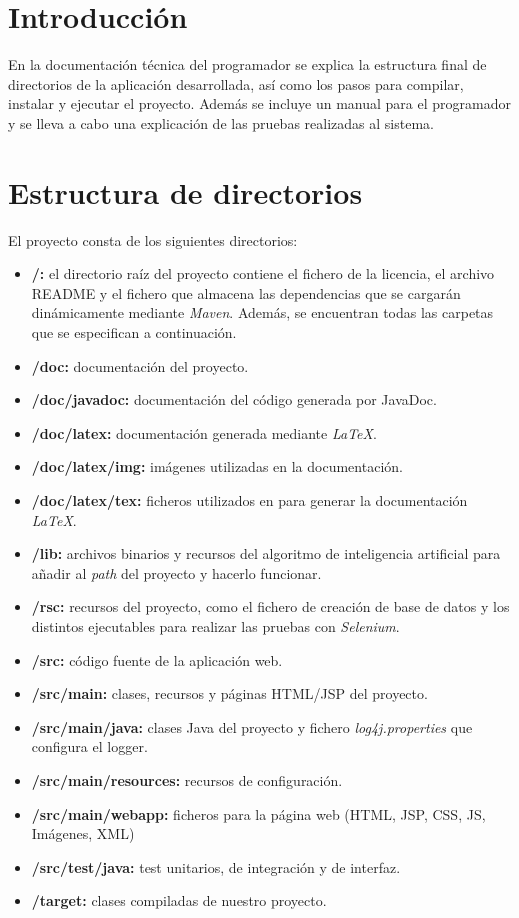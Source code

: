 
\section{Introducción}

En la documentación técnica del programador se explica la estructura final de directorios de la aplicación desarrollada, así como los pasos para compilar, instalar y ejecutar el proyecto. Además se incluye un manual para el programador y se lleva a cabo una explicación de las pruebas realizadas al sistema.

\section{Estructura de directorios}

El proyecto consta de los siguientes directorios:

\begin{itemize}
\tightlist
\item \textbf{/:} el directorio raíz del proyecto contiene el fichero de la licencia, el archivo README y el fichero que almacena las dependencias que se cargarán dinámicamente mediante \emph{Maven}. Además, se encuentran todas las carpetas que se especifican a continuación.
\item \textbf{/doc:} documentación del proyecto.
\item \textbf{/doc/javadoc:} documentación del código generada por JavaDoc.
\item \textbf{/doc/latex:} documentación generada mediante \emph{LaTeX}.
\item \textbf{/doc/latex/img:} imágenes utilizadas en la documentación.
\item \textbf{/doc/latex/tex:} ficheros utilizados en para generar la documentación \emph{LaTeX}.
\item \textbf{/lib:} archivos binarios y recursos del algoritmo de inteligencia artificial para añadir al \emph{path} del proyecto y hacerlo funcionar.
\item \textbf{/rsc:} recursos del proyecto, como el fichero de creación de base de datos y los distintos ejecutables para realizar las pruebas con \emph{Selenium}.
\item \textbf{/src:} código fuente de la aplicación web.
\item \textbf{/src/main:} clases, recursos y páginas HTML/JSP del proyecto.
\item \textbf{/src/main/java:} clases Java del proyecto y fichero \emph{log4j.properties} que configura el logger.
\item \textbf{/src/main/resources:} recursos de configuración.
\item \textbf{/src/main/webapp:} ficheros para la página web (HTML, JSP, CSS, JS, Imágenes, XML)
\item \textbf{/src/test/java: } test unitarios, de integración y de interfaz.
\item \textbf{/target:} clases compiladas de nuestro proyecto.
\end{itemize}

